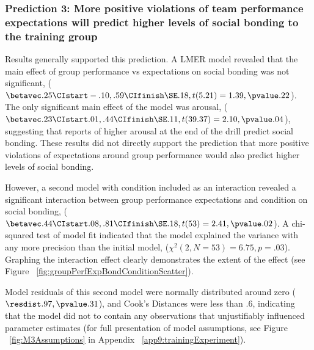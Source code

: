 \subsubsection{Prediction 3: More positive violations of team performance expectations will predict higher levels of social bonding to the training group}


Results generally supported this prediction.  A LMER model revealed that the main effect of group performance vs expectations on social bonding was not significant, ($\betavec .25 \CIstart -.10, .59 \CIfinish \SE .18, t(5.21) = 1.39, \pvalue .22$).  The only significant main effect of the model was arousal, ($\betavec .23 \CIstart .01, .44 \CIfinish \SE .11, t(39.37) = 2.10, \pvalue .04$), suggesting that reports of higher arousal at the end of the drill predict social bonding.  These results did not directly support the prediction that more positive violations of expectations around group performance would also predict higher levels of social bonding.

However, a second model with condition included as an interaction revealed a significant interaction between group performance expectations and condition on social bonding, ($\betavec .44 \CIstart .08, .81 \CIfinish \SE .18, t(53) = 2.41, \pvalue .02$).  A chi-squared test of model fit indicated that the model explained the variance with any more precision than the initial model, ($\chi^2 (2, N = 53) = 6.75, p = .03$).  Graphing the interaction effect clearly demonstrates the extent of the effect (see Figure ~\ref{fig:groupPerfExpBondConditionScatter}).

Model residuals of this second model were normally distributed around zero ($\resdist .97, \pvalue .31$), and Cook's Distances were less than $.6$, indicating that the model did not to contain any observations that unjustifiably influenced parameter estimates (for full presentation of model assumptions, see Figure ~\ref{fig:M3Assumptions} in Appendix ~\ref{app9:trainingExperiment}).

